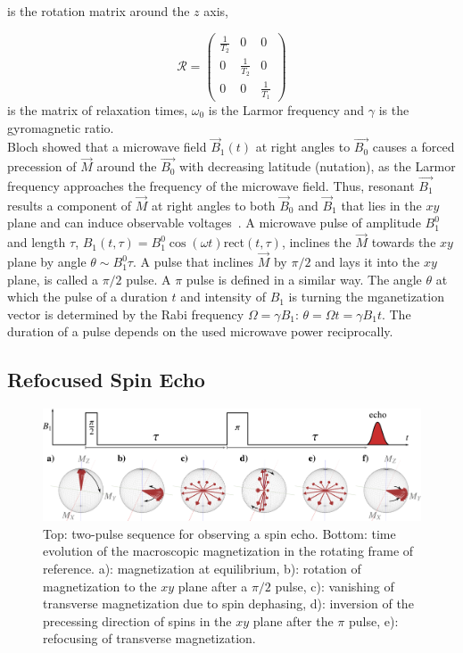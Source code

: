 is the rotation matrix around the $z$ axis, 

\begin{equation}
\mathscr{R}=
\begin{pmatrix}
    \frac{1}{T_2} & 0 & 0\\
	0 & \frac{1}{T_2} & 0\\
	0 & 0 & \frac{1}{T_1}
  \end{pmatrix}
\end{equation}
is the matrix of relaxation times, $\omega_0$ is the Larmor frequency and $\gamma$ is the gyromagnetic ratio.\\


Bloch showed that a microwave field $\vec{B}_1(t)$ at right angles to $\vec{B_0}$ causes a forced precession of $\vec{M}$ around the $\vec{B_0}$ with decreasing latitude (nutation), as the Larmor frequency
approaches the frequency of the microwave field. Thus, resonant $\vec{B_1}$ results a component of $\vec{M}$ at right angles to both $\vec{B}_0$ and $\vec{B}_1$ that lies in the $xy$ plane and can induce observable voltages~\cite{Bloch_1946}. A microwave pulse of amplitude $B_1^0$ and length $\tau$, $B_1(t,\tau) = B_1^0\cos(\omega t)$rect$(t,\tau)$, inclines the $\vec{M}$ towards the $xy$ plane by angle $\theta \sim B_1^0\tau$. A pulse that inclines $\vec{M}$ by $\pi/2$ and lays it into the $xy$ plane, is called a $\pi/2$ pulse. A $\pi$ pulse is defined in a similar way. The angle $\theta$ at which the pulse of a duration $t$ and intensity of $B_1$ is turning the mganetization vector is determined by the Rabi frequency $\Omega=\gamma B_1$: $\theta=\Omega t = \gamma B_1 t$. The duration of a pulse depends on the used microwave power reciprocally.


\subsection{Refocused Spin Echo}
\label{subs:spin_echo}

\begin{figure}[h]
\center
	\includegraphics[width=1\textwidth]{./epr_basics/fse.pdf}
	\caption{Top: two-pulse sequence for observing a spin echo. Bottom: time evolution of the macroscopic magnetization in the rotating frame of reference. a): magnetization at equilibrium, b): rotation of magnetization to the $xy$ plane after a $\pi/2$ pulse, c): vanishing of transverse magnetization due to spin dephasing, d): inversion of the precessing direction of spins in the $xy$ plane after the $\pi$ pulse, e): refocusing of transverse magnetization.}
	\label{fig:spin_echo_diagram}
\end{figure}


